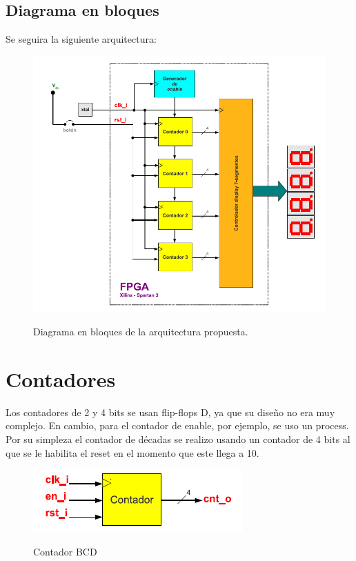 \documentclass{article}
\begin{document}
\subsection{Diagrama en bloques}

Se seguira la siguiente arquitectura:
\\

\begin{figure}[h!]
  \centering
	\includegraphics[scale=0.7]{arquitectura.png}\\[1cm] 
  \caption{Diagrama en bloques de la arquitectura propuesta.}
\end{figure}



\section{Contadores}

Los contadores de 2 y 4 bits se usan flip-flops D, ya que su diseño no era muy complejo. En cambio, para el contador de enable, por ejemplo, se uso un process.
Por su simpleza el contador de décadas se realizo usando un contador de 4 bits al que se le habilita el reset en el momento que este llega a 10.

\begin{figure}[h!]
  \centering
	\includegraphics[scale=0.7]{contador.png}\\[1cm] 
  \caption{Contador BCD}
\end{figure}
\end{document}
